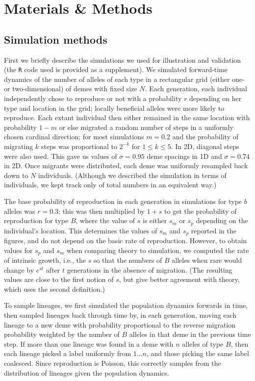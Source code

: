 \documentclass[10pt,letterpaper]{article}
\begin{document}
\section*{Materials \& Methods}

\subsection*{Simulation methods}
\label{ss:simulations}

First we briefly describe the simulations we used for illustration and validation
(the \texttt{R} code used is provided as a supplement).
We simulated forward-time dynamics of the number of alleles of each type in a rectangular grid (either one- or two-dimensional) of demes with fixed size $N$.
Each generation, each individual independently chose to reproduce or not with a probability $r$ depending on her type and location in the grid;
locally beneficial alleles were more likely to reproduce.
Each extant individual then either remained in the same location with probability $1-m$
or else migrated a random number of steps 
in a uniformly chosen cardinal direction; 
for most simulations $m=0.2$ and
the probability of migrating $k$ steps was proportional to $2^{-k}$ for $1\le k \le 5$.
In 2D, diagonal steps were also used.
This gave us values of $\sigma=0.95$ deme spacings in 1D
and $\sigma=0.74$ in 2D.
Once migrants were distributed, each deme was uniformly resampled back down to $N$ individuals.
(Although we described the simulation in terms of individuals,
we kept track only of total numbers in an equivalent way.)

The base probability of reproduction in each generation in simulations for type $b$ alleles was $r=0.3$;
this was then multiplied by $1+s$ to get the probability of reproduction for type $B$,
where the value of $s$ is either $s_m$ or $s_p$ depending on the individual's location.
This determines the values of $s_m$ and $s_p$ reported in the figures, 
and do not depend on the basic rate of reproduction.
However, to obtain values for $s_p$ and $s_m$ when comparing theory to simulation,
we computed the rate of intrinsic growth, 
i.e., the $s$ so that the numbers of $B$ alleles when rare would change by $e^{st}$ after $t$ generations
in the absence of migration.
(The resulting values are close to the first notion of $s$,
but give better agreement with theory,
which uses the second definition.)

To sample lineages, we first simulated the population dynamics forwards in time,
then sampled lineages back through time
by, in each generation,
moving each lineage to a new deme with probability proportional to the reverse migration probability
weighted by the number of $B$ alleles in that deme in the previous time step.
If more than one lineage was found in a deme with $n$ alleles of type $B$,
then each lineage picked a label uniformly from $1 \ldots n$,
and those picking the same label coalesced.
Since reproduction is Poisson, this correctly samples from the distribution of lineages given the population dynamics.
\end{document}
